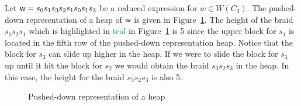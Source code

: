 \begin{example}
Let $\mathsf{w}=s_0s_1s_3s_2s_1s_0s_1s_3$ be a reduced expression for $w \in W(C_3)$. The pushed-down representation of a heap of $\mathsf{w}$ is given in Figure~\ref{fig:pusheddownheap}. The height of the braid $s_1s_2s_1$ which is highlighted in \textcolor{teal}{teal} in Figure~\ref{fig:pusheddownheap} is 5 since the upper block for $s_1$ is located in the fifth row of the pushed-down representation heap. Notice that the block for $s_3$ can slide up higher in the heap. If we were to slide the block for $s_3$ up until it hit the block for $s_2$ we would obtain the braid $s_3s_2s_3$ in the heap. In this case, the height for the braid $s_3s_2s_3$ is also 5.   

\begin{figure}[h!] \centering
{}	
\caption{Pushed-down representation of a heap}\label{fig:pusheddownheap}
\end{figure}

	
\end{example}


